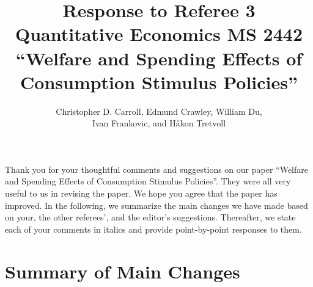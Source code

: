 \documentclass[12pt,letterpaper,english]{article}
\title{\textbf{Response to Referee 3 \\ Quantitative Economics MS 2442 \\``Welfare and Spending Effects of \\ Consumption Stimulus Policies''}}
\author{Christopher D. Carroll, Edmund Crawley, William Du, \\ Ivan Frankovic, and H\aa kon Tretvoll}
\date{}
\begin{document}
	\onehalfspacing
	\maketitle
	
	\noindent Thank you for your thoughtful comments and suggestions on our paper ``Welfare and Spending Effects of Consumption Stimulus Policies''. They were all very useful to us in revising the paper. We hope you agree that the paper has improved. In the following, we summarize the main changes we have made based on your, the other referees', and the editor's suggestions. Thereafter, we state each of your comments in italics and provide point-by-point responses to them.
	
	\section{Summary of Main Changes}
	

	
	\newpage 
	
\end{document}
